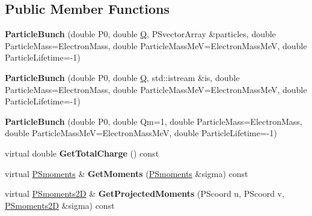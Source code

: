 \subsection*{Public Member Functions}
\begin{DoxyCompactItemize}
\item 
\mbox{\label{classParticleTracking_1_1ParticleBunch_a12394eff212a7664fe65ad97a079a6b4}} 
{\bfseries Particle\+Bunch} (double P0, double \hyperlink{namespaceParticleTracking_a3e89510a540596b235a808915deb0f7a}{Q}, P\+Svector\+Array \&particles, double Particle\+Mass=Electron\+Mass, double Particle\+Mass\+MeV=Electron\+Mass\+MeV, double Particle\+Lifetime=-\/1)
\item 
\mbox{\label{classParticleTracking_1_1ParticleBunch_a307d5ce629c73b76513e952d7270d4eb}} 
{\bfseries Particle\+Bunch} (double P0, double \hyperlink{namespaceParticleTracking_a3e89510a540596b235a808915deb0f7a}{Q}, std\+::istream \&is, double Particle\+Mass=Electron\+Mass, double Particle\+Mass\+MeV=Electron\+Mass\+MeV, double Particle\+Lifetime=-\/1)
\item 
\mbox{\label{classParticleTracking_1_1ParticleBunch_acc7f07ef2381743da030b0296c1801b8}} 
{\bfseries Particle\+Bunch} (double P0, double Qm=1, double Particle\+Mass=Electron\+Mass, double Particle\+Mass\+MeV=Electron\+Mass\+MeV, double Particle\+Lifetime=-\/1)
\item 
\mbox{\label{classParticleTracking_1_1ParticleBunch_a9101597f075e6db1f4a6ba36febbfc49}} 
virtual double {\bfseries Get\+Total\+Charge} () const
\item 
\mbox{\label{classParticleTracking_1_1ParticleBunch_aab885f000312f068bdd65a0b09653277}} 
virtual \hyperlink{classTPSMoments}{P\+Smoments} \& {\bfseries Get\+Moments} (\hyperlink{classTPSMoments}{P\+Smoments} \&sigma) const
\item 
\mbox{\label{classParticleTracking_1_1ParticleBunch_a627e89f5e2ded0fdc69772a3a3a8eb1b}} 
virtual \hyperlink{classTPSMoments_3_011_01_4}{P\+Smoments2D} \& {\bfseries Get\+Projected\+Moments} (P\+Scoord u, P\+Scoord v, \hyperlink{classTPSMoments_3_011_01_4}{P\+Smoments2D} \&sigma) const

\end{DoxyCompactItemize}

